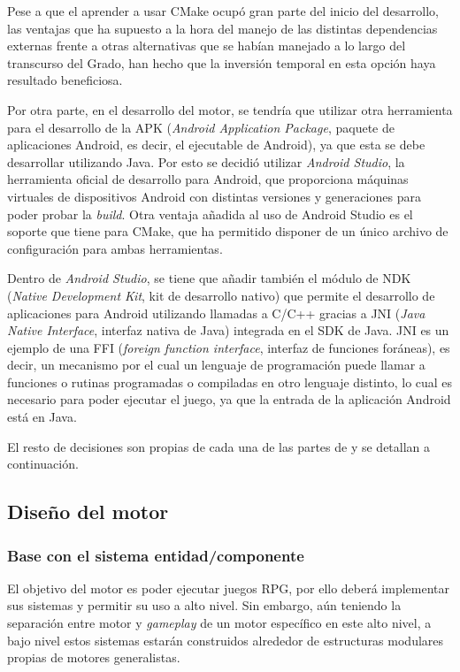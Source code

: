\smallskip

Pese a que el aprender a usar CMake ocupó gran parte del inicio del desarrollo, las ventajas que ha supuesto a la hora del manejo de las distintas dependencias externas frente a otras alternativas que se habían manejado a lo largo del transcurso del Grado, han hecho que la inversión temporal en esta opción haya resultado beneficiosa.

\medskip

Por otra parte, en el desarrollo del motor, se tendría que utilizar otra herramienta para el desarrollo de la APK (\textit{Android Application Package}, paquete de aplicaciones Android, es decir, el ejecutable de Android), ya que esta se debe desarrollar utilizando Java. Por esto se decidió utilizar \textit{Android Studio}, la herramienta oficial de desarrollo para Android, que proporciona máquinas virtuales de dispositivos Android con distintas versiones y generaciones para poder probar la \textit{build}. Otra ventaja añadida al uso de Android Studio es el soporte que tiene para CMake, que ha permitido disponer de un único archivo de configuración para ambas herramientas.

\smallskip

Dentro de \textit{Android Studio}, se tiene que añadir también el módulo de NDK (\textit{Native Development Kit}, kit de desarrollo nativo) que permite el desarrollo de aplicaciones para Android utilizando llamadas a C/C++ gracias a JNI (\textit{Java Native Interface}, interfaz nativa de Java) integrada en el SDK de Java. JNI es un ejemplo de una FFI (\textit{foreign function interface}, interfaz de funciones foráneas), es decir, un mecanismo por el cual un lenguaje de programación puede llamar a funciones o rutinas programadas o compiladas en otro lenguaje distinto, lo cual es necesario para poder ejecutar el juego, ya que la entrada de la aplicación Android está en Java.

\medskip

El resto de decisiones son propias de cada una de las partes de \baker{} y se detallan a continuación.

\subsection{Diseño del motor}
\subsubsection{Base con el sistema entidad/componente}
El objetivo del motor es poder ejecutar juegos RPG, por ello deberá implementar sus sistemas y permitir su uso a alto nivel. Sin embargo, aún teniendo la separación entre motor y \textit{gameplay} de un motor específico en este alto nivel, a bajo nivel estos sistemas estarán construidos alrededor de estructuras modulares propias de motores generalistas.

